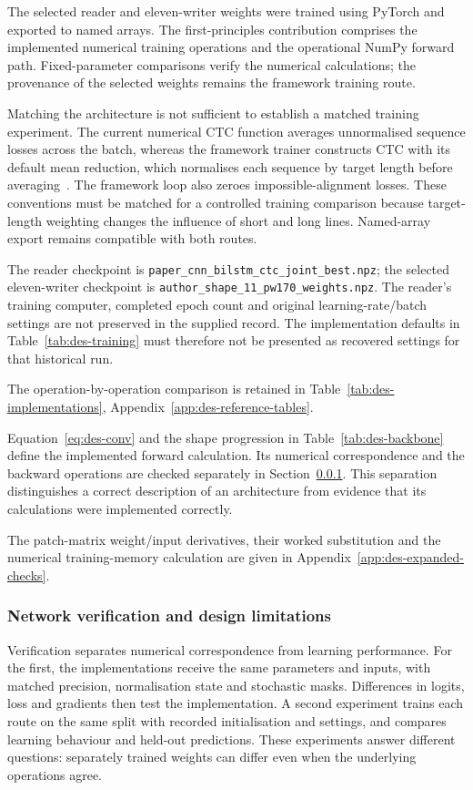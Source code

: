 The selected reader and eleven-writer weights were trained using PyTorch and exported to named arrays. The first-principles contribution comprises the implemented numerical training operations and the operational NumPy forward path. Fixed-parameter comparisons verify the numerical calculations; the provenance of the selected weights remains the framework training route.

Matching the architecture is not sufficient to establish a matched training experiment. The current numerical CTC function averages unnormalised sequence losses across the batch, whereas the framework trainer constructs CTC with its default mean reduction, which normalises each sequence by target length before averaging~\cite[CTCLoss, ``Parameters'' ]{pytorchctc}. The framework loop also zeroes impossible-alignment losses. These conventions must be matched for a controlled training comparison because target-length weighting changes the influence of short and long lines. Named-array export remains compatible with both routes.

The reader checkpoint is \texttt{paper\_cnn\_bilstm\_ctc\_joint\_best.npz}; the selected eleven-writer checkpoint is \texttt{author\_shape\_11\_pw170\_weights.npz}. The reader's training computer, completed epoch count and original learning-rate/batch settings are not preserved in the supplied record. The implementation defaults in Table~\ref{tab:des-training} must therefore not be presented as recovered settings for that historical run.

The operation-by-operation comparison is retained in Table~\ref{tab:des-implementations}, Appendix~\ref{app:des-reference-tables}.


Equation~\ref{eq:des-conv} and the shape progression in Table~\ref{tab:des-backbone} define the implemented forward calculation. Its numerical correspondence and the backward operations are checked separately in Section~\ref{sec:des-netverify}. This separation distinguishes a correct description of an architecture from evidence that its calculations were implemented correctly.

The patch-matrix weight/input derivatives, their worked substitution and the numerical training-memory calculation are given in Appendix~\ref{app:des-expanded-checks}.

\subsubsection{Network verification and design limitations}
\label{sec:des-netverify}
Verification separates numerical correspondence from learning performance. For the first, the implementations receive the same parameters and inputs, with matched precision, normalisation state and stochastic masks. Differences in logits, loss and gradients then test the implementation. A second experiment trains each route on the same split with recorded initialisation and settings, and compares learning behaviour and held-out predictions. These experiments answer different questions: separately trained weights can differ even when the underlying operations agree.


